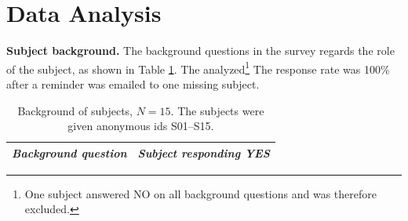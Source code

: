 \documentclass[runningheads,a4paper]{llncs}
\begin{document}
\section{Data Analysis}

\textbf{Subject background.} The background questions in the survey regards the role of the subject, as shown in Table \ref{table:background}. The analyzed\footnote{One subject answered NO on all background questions and was therefore excluded.}  The response rate was 100\% after a reminder was emailed to one missing subject.


\begingroup
\begin{table}[H]
\setlength{\tabcolsep}{4pt} %
\renewcommand{\arraystretch}{1.4} %
\centering
\fontsize{8.5}{9}\selectfont
\caption{Background of subjects, $N = 15$. The subjects were given anonymous ids S01--S15.}
\label{table:background}
\begin{tabular}{p{}| p{}}
\textit{Background question} & \textit{Subject responding YES}  \\ \hline

 \end{tabular}
\end{table}
\endgroup
\end{document}
